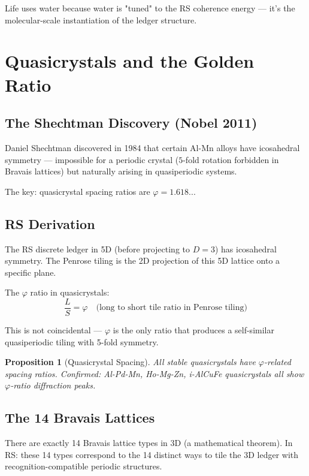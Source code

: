 \documentclass[12pt,a4paper]{article}
\newtheorem{proposition}[theorem]{Proposition}
\theoremstyle{definition}
\theoremstyle{remark}
\begin{document}
Life uses water because water is "tuned" to the RS coherence energy — it's the 
molecular-scale instantiation of the ledger structure.

\section{Quasicrystals and the Golden Ratio}

\subsection{The Shechtman Discovery (Nobel 2011)}

Daniel Shechtman discovered in 1984 that certain Al-Mn alloys have icosahedral 
symmetry — impossible for a periodic crystal ($5$-fold rotation forbidden in Bravais 
lattices) but naturally arising in quasiperiodic systems.

The key: quasicrystal spacing ratios are $\varphi = 1.618...$

\subsection{RS Derivation}

The RS discrete ledger in 5D (before projecting to $D = 3$) has icosahedral symmetry.
The Penrose tiling is the 2D projection of this 5D lattice onto a specific plane.

The $\varphi$ ratio in quasicrystals:
\begin{equation}
\frac{L}{S} = \varphi \quad \text{(long to short tile ratio in Penrose tiling)}
\end{equation}

This is not coincidental — $\varphi$ is the only ratio that produces a self-similar 
quasiperiodic tiling with 5-fold symmetry.

\begin{proposition}[Quasicrystal Spacing]
All stable quasicrystals have $\varphi$-related spacing ratios.
Confirmed: Al-Pd-Mn, Ho-Mg-Zn, i-AlCuFe quasicrystals all show $\varphi$-ratio diffraction peaks.
\end{proposition}

\subsection{The 14 Bravais Lattices}

There are exactly 14 Bravais lattice types in 3D (a mathematical theorem).
In RS: these 14 types correspond to the 14 distinct ways to tile the 3D ledger 
with recognition-compatible periodic structures.
\end{document}
